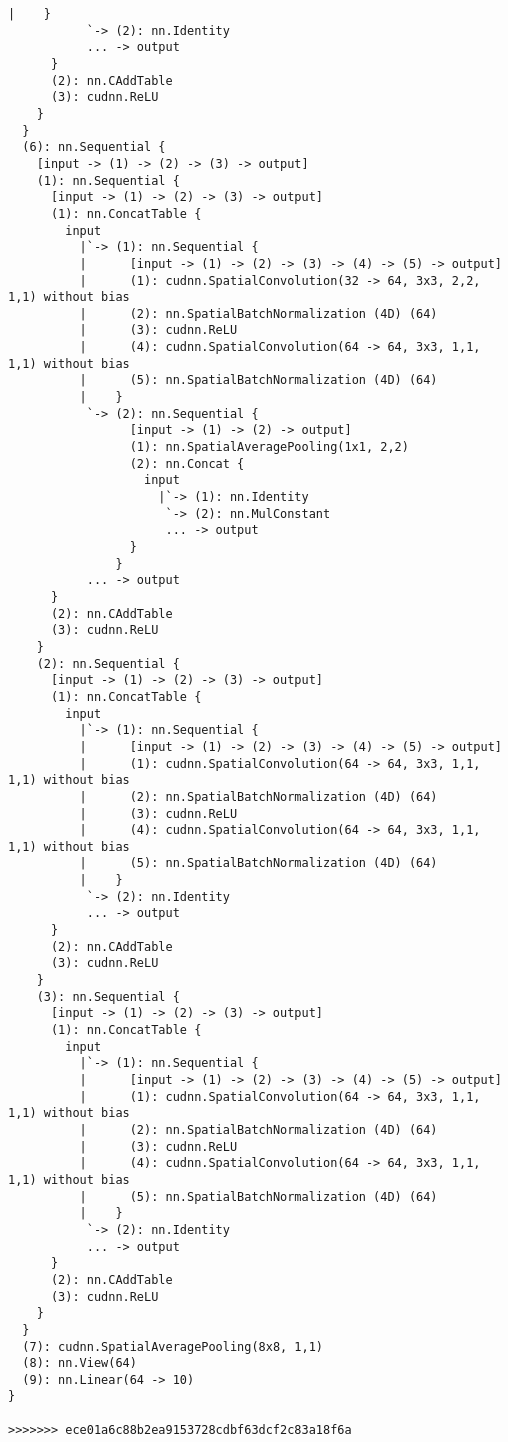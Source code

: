 \begin{lstlisting}[language={[5.2]Lua}]
          |    }
           `-> (2): nn.Identity
           ... -> output
      }
      (2): nn.CAddTable
      (3): cudnn.ReLU
    }
  }
  (6): nn.Sequential {
    [input -> (1) -> (2) -> (3) -> output]
    (1): nn.Sequential {
      [input -> (1) -> (2) -> (3) -> output]
      (1): nn.ConcatTable {
        input
          |`-> (1): nn.Sequential {
          |      [input -> (1) -> (2) -> (3) -> (4) -> (5) -> output]
          |      (1): cudnn.SpatialConvolution(32 -> 64, 3x3, 2,2, 1,1) without bias
          |      (2): nn.SpatialBatchNormalization (4D) (64)
          |      (3): cudnn.ReLU
          |      (4): cudnn.SpatialConvolution(64 -> 64, 3x3, 1,1, 1,1) without bias
          |      (5): nn.SpatialBatchNormalization (4D) (64)
          |    }
           `-> (2): nn.Sequential {
                 [input -> (1) -> (2) -> output]
                 (1): nn.SpatialAveragePooling(1x1, 2,2)
                 (2): nn.Concat {
                   input
                     |`-> (1): nn.Identity
                      `-> (2): nn.MulConstant
                      ... -> output
                 }
               }
           ... -> output
      }
      (2): nn.CAddTable
      (3): cudnn.ReLU
    }
    (2): nn.Sequential {
      [input -> (1) -> (2) -> (3) -> output]
      (1): nn.ConcatTable {
        input
          |`-> (1): nn.Sequential {
          |      [input -> (1) -> (2) -> (3) -> (4) -> (5) -> output]
          |      (1): cudnn.SpatialConvolution(64 -> 64, 3x3, 1,1, 1,1) without bias
          |      (2): nn.SpatialBatchNormalization (4D) (64)
          |      (3): cudnn.ReLU
          |      (4): cudnn.SpatialConvolution(64 -> 64, 3x3, 1,1, 1,1) without bias
          |      (5): nn.SpatialBatchNormalization (4D) (64)
          |    }
           `-> (2): nn.Identity
           ... -> output
      }
      (2): nn.CAddTable
      (3): cudnn.ReLU
    }
    (3): nn.Sequential {
      [input -> (1) -> (2) -> (3) -> output]
      (1): nn.ConcatTable {
        input
          |`-> (1): nn.Sequential {
          |      [input -> (1) -> (2) -> (3) -> (4) -> (5) -> output]
          |      (1): cudnn.SpatialConvolution(64 -> 64, 3x3, 1,1, 1,1) without bias
          |      (2): nn.SpatialBatchNormalization (4D) (64)
          |      (3): cudnn.ReLU
          |      (4): cudnn.SpatialConvolution(64 -> 64, 3x3, 1,1, 1,1) without bias
          |      (5): nn.SpatialBatchNormalization (4D) (64)
          |    }
           `-> (2): nn.Identity
           ... -> output
      }
      (2): nn.CAddTable
      (3): cudnn.ReLU
    }
  }
  (7): cudnn.SpatialAveragePooling(8x8, 1,1)
  (8): nn.View(64)
  (9): nn.Linear(64 -> 10)
}

>>>>>>> ece01a6c88b2ea9153728cdbf63dcf2c83a18f6a
\end{lstlisting}
